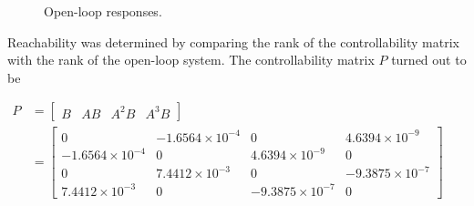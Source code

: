 \documentclass[]{aiaa-tc}%
\begin{document}
	\vspace{5 mm}

	\begin{figure}[H]
		\centering
		\caption{Open-loop responses. }
		\label{fig:StepResp}
	\end{figure}	

	Reachability was determined by comparing the rank of the controllability matrix with the rank of the open-loop system. The controllability matrix $P$ turned out to be 

	\vspace{5 mm}

{\centering
 $\begin{aligned}
P&=\begin{bmatrix}
B & AB & A^2B &A^3B 
\end{bmatrix}\\
&=\begin{bmatrix}
            0 &     -1.6564\times10^{-4} &             0 &    4.6394\times10^{-9}\\ 
  -1.6564\times10^{-4} &               0 &    4.6394\times10^{-9} &             0\\ 
            0 &      7.4412\times10^{-3} &             0 &   -9.3875\times10^{-7}\\ 
   7.4412\times10^{-3} &               0 &   -9.3875\times10^{-7} &             0
\end{bmatrix}
\end{aligned}$\par}
	\vspace{5 mm}
\end{document}

